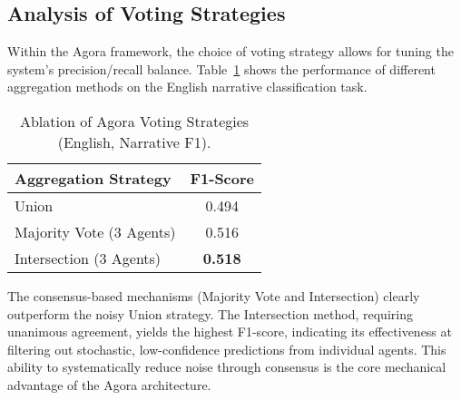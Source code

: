 \subsection{Analysis of Voting Strategies}

Within the Agora framework, the choice of voting strategy allows for tuning the system's precision/recall balance. Table~\ref{tab:voting_strategies} shows the performance of different aggregation methods on the English narrative classification task.

\begin{table}[!ht]
\centering
\caption{Ablation of Agora Voting Strategies (English, Narrative F1).}
\label{tab:voting_strategies}
\begin{tabular}{lc}
\hline
\textbf{Aggregation Strategy} & \textbf{F1-Score} \\
\hline
Union & 0.494 \\
Majority Vote (3 Agents) & 0.516 \\
Intersection (3 Agents) & \textbf{0.518} \\
\hline
\end{tabular}
\end{table}

The consensus-based mechanisms (Majority Vote and Intersection) clearly outperform the noisy Union strategy. The Intersection method, requiring unanimous agreement, yields the highest F1-score, indicating its effectiveness at filtering out stochastic, low-confidence predictions from individual agents. This ability to systematically reduce noise through consensus is the core mechanical advantage of the Agora architecture.


